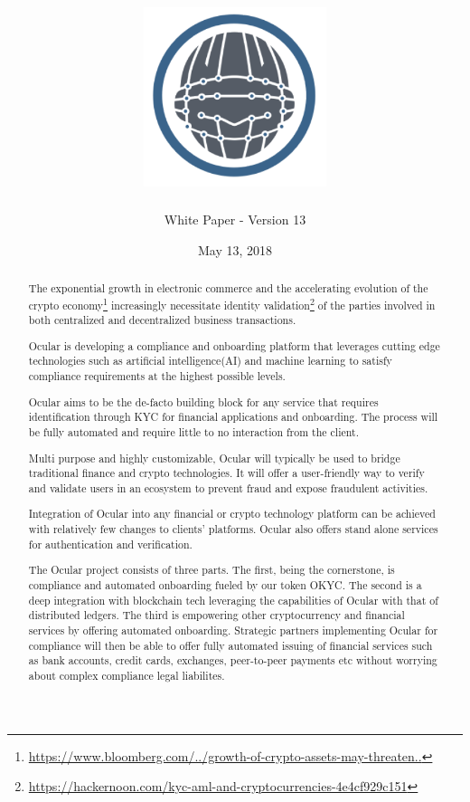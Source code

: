 \documentclass[a4paper]{article}
\title{\includegraphics[width=0.4\textwidth]{logo.png}}
\author{White Paper - Version 13}
\date{May 13, 2018}
\begin{document}
\maketitle

\begin{abstract}
The exponential growth in electronic commerce and the accelerating evolution of the crypto economy\footnote{\href{https://www.bloomberg.com/news/articles/2018-03-18/growth-of-crypto-assets-may-threaten-financial-system-fsb-says}{https://www.bloomberg.com/../growth-of-crypto-assets-may-threaten..}} increasingly necessitate identity validation\footnote{\url{https://hackernoon.com/kyc-aml-and-cryptocurrencies-4e4cf929c151}} of the parties involved in both centralized and decentralized business transactions. 

Ocular is developing a compliance and onboarding platform that leverages cutting edge technologies such as artificial intelligence(AI) and machine learning to satisfy compliance requirements at the highest possible levels.

Ocular aims to be the de-facto building block for any service that requires identification through KYC for financial applications and onboarding. The process will be fully automated and require little to no interaction from the client. 

Multi purpose and highly customizable, Ocular will typically be used to bridge traditional finance and crypto technologies. It will offer a user-friendly way to verify and validate users in an ecosystem to prevent fraud and expose fraudulent activities. 

Integration of Ocular into any financial or crypto technology platform can be achieved with relatively few changes to clients’ platforms. Ocular also offers stand alone services for authentication and verification. 

The Ocular project consists of three parts. The first, being the cornerstone, is compliance and automated onboarding fueled by our token OKYC. The second is a deep integration with blockchain tech leveraging the capabilities of Ocular with that of distributed ledgers. The third is empowering other cryptocurrency and financial services by offering automated onboarding. Strategic partners implementing Ocular for compliance will then be able to offer fully automated issuing of financial services such as bank accounts, credit cards, exchanges, peer-to-peer payments etc without worrying about complex compliance legal liabilites. 
\end{abstract}
\end{document}
